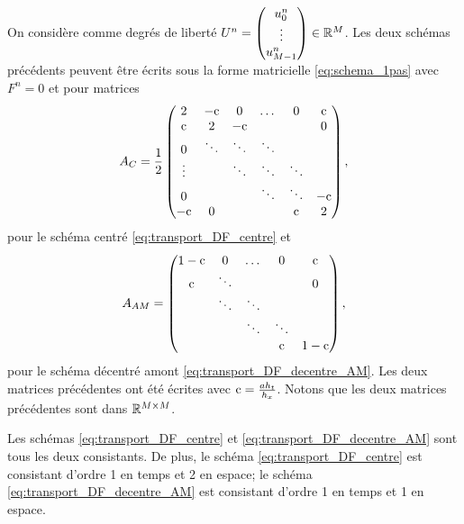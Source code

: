 \documentclass[12pt,a4paper,twoside]{article}
\begin{document}
On consid\`ere comme degr\'es de libert\'e
$U^n = 
\begin{pmatrix}
  u_0^n \\ \vdots \\ u_{M-1}^n
\end{pmatrix}
\in \mathbb{R}^M
$.
Les deux sch\'emas pr\'ec\'edents peuvent \^etre \'ecrits sous la forme matricielle 
\eqref{eq:schema_1pas} avec $F^n = 0$ et pour matrices
\begin{align}
  A_{C} = \dfrac{1}{2}
  \begin{pmatrix}
    2 & -\mathrm{c} & 0 & \dots & 0 & \mathrm{c}
    \\
    \mathrm{c} & 2 & -\mathrm{c} & & & 0
    \\
    0 & \ddots & \ddots & \ddots & &
    \\
    \vdots & & \ddots & \ddots & \ddots
    \\
    0 & & & \ddots & \ddots & -\mathrm{c}
    \\
    -\mathrm{c} & 0 & & & \mathrm{c} & 2
  \end{pmatrix},
\end{align}
pour le sch\'ema centr\'e \eqref{eq:transport_DF_centre}
et
\begin{align}
  A_{AM} = 
  \begin{pmatrix}
    1-\mathrm{c} & 0 & \dots & 0 & \mathrm{c}
    \\
    \mathrm{c} & \ddots & & & 0
    \\
    & \ddots & \ddots &   &
    \\
    & & \ddots & \ddots &
    \\
    &&   &  \mathrm{c} & 1-\mathrm{c}
  \end{pmatrix},
\end{align}
pour le sch\'ema d\'ecentr\'e amont \eqref{eq:transport_DF_decentre_AM}.
Les deux matrices pr\'ec\'edentes ont \'et\'e \'ecrites avec 
$\mathrm{c} = \frac{a h_t}{h_x}$.
Notons que les deux matrices pr\'ec\'edentes sont dans
$\mathbb{R}^{M \times M}$.

\begin{proposition}
  Les sch\'emas \eqref{eq:transport_DF_centre} et \eqref{eq:transport_DF_decentre_AM}
  sont tous les deux consistants.
  De plus, le sch\'ema \eqref{eq:transport_DF_centre} est consistant d'ordre 1
  en temps et 2 en espace;
  le sch\'ema \eqref{eq:transport_DF_decentre_AM} est consistant d'ordre 1
  en temps et 1 en espace.
\end{proposition}
\end{document}
